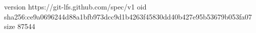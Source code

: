 version https://git-lfs.github.com/spec/v1
oid sha256:ce9a0696244d88a1bfb973dcc9d1b4263f45830dd40b427e95b53679b053fa07
size 87544
